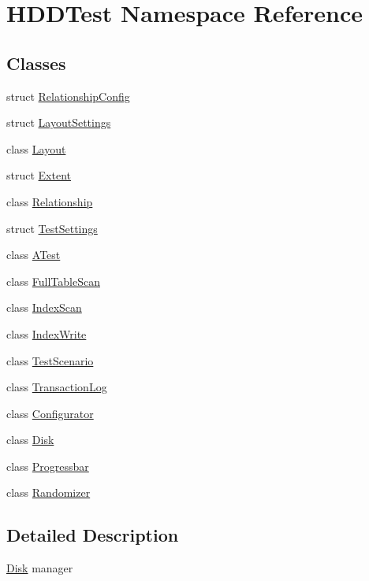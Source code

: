 \hypertarget{namespace_h_d_d_test}{\section{H\-D\-D\-Test Namespace Reference}
\label{namespace_h_d_d_test}
}
\subsection*{Classes}
\begin{DoxyCompactItemize}
\item 
struct \hyperlink{struct_h_d_d_test_1_1_relationship_config}{Relationship\-Config}
\item 
struct \hyperlink{struct_h_d_d_test_1_1_layout_settings}{Layout\-Settings}
\item 
class \hyperlink{class_h_d_d_test_1_1_layout}{Layout}
\item 
struct \hyperlink{struct_h_d_d_test_1_1_extent}{Extent}
\item 
class \hyperlink{class_h_d_d_test_1_1_relationship}{Relationship}
\item 
struct \hyperlink{struct_h_d_d_test_1_1_test_settings}{Test\-Settings}
\item 
class \hyperlink{class_h_d_d_test_1_1_a_test}{A\-Test}
\item 
class \hyperlink{class_h_d_d_test_1_1_full_table_scan}{Full\-Table\-Scan}
\item 
class \hyperlink{class_h_d_d_test_1_1_index_scan}{Index\-Scan}
\item 
class \hyperlink{class_h_d_d_test_1_1_index_write}{Index\-Write}
\item 
class \hyperlink{class_h_d_d_test_1_1_test_scenario}{Test\-Scenario}
\item 
class \hyperlink{class_h_d_d_test_1_1_transaction_log}{Transaction\-Log}
\item 
class \hyperlink{class_h_d_d_test_1_1_configurator}{Configurator}
\item 
class \hyperlink{class_h_d_d_test_1_1_disk}{Disk}
\item 
class \hyperlink{class_h_d_d_test_1_1_progressbar}{Progressbar}
\item 
class \hyperlink{class_h_d_d_test_1_1_randomizer}{Randomizer}
\end{DoxyCompactItemize}


\subsection{Detailed Description}
\hyperlink{class_h_d_d_test_1_1_disk}{Disk} manager 
